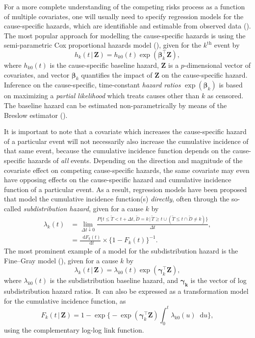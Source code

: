 \documentclass[
  letterpaper,
  paper=240mm:170mm,
  twoside=true,
  open=right,
  fontsize=10pt,
  pagesize=false,
  BCOR=15mm,
  DIV=14,
  headinclude=true,
  footinclude=false,
  headsepline=on]{scrbook}
\newcommand{\given}{\,|\,}
\newcommand\diff{\mathop{}\!\mathrm{d}}
\begin{document}
For a more complete understanding of the competing risks process as a
function of multiple covariates, one will usually need to specify
regression models for the cause-specific hazards, which are identifiable
and estimable from observed data
(). The most popular approach for modelling the cause-specific
hazards is using the semi-parametric Cox proportional hazards model
(), given for
the \(k^{\text{th}}\) event by \[
h_k(t \given \mathbf{Z}) = h_{k0}(t)\exp(\boldsymbol{\beta}_k^\intercal \mathbf{Z}),
\] where \(h_{k0}(t)\) is the cause-specific baseline hazard,
\(\mathbf{Z}\) is a \(p\)-dimensional vector of covariates, and vector
\(\boldsymbol{\beta}_k\) quantifies the impact of \(\mathbf{Z}\) on the
cause-specific hazard. Inference on the cause-specific, time-constant
\emph{hazard ratios} \(\exp(\boldsymbol{\beta}_k)\) is based on
maximizing a \emph{partial likelihood} which treats causes other than
\(k\) as censored. The baseline hazard can be estimated
non-parametrically by means of the Breslow estimator
().

It is important to note that a covariate which increases the
cause-specific hazard of a particular event will not necessarily also
increase the cumulative incidence of that same event, because the
cumulative incidence function depends on the cause-specific hazards of
\emph{all} events. Depending on the direction and magnitude of the
covariate effect on competing cause-specific hazards, the same covariate
may even have opposing effects on the cause-specific hazard and
cumulative incidence function of a particular event. As a result,
regression models have been proposed that model the cumulative incidence
function(s) \emph{directly}, often through the so-called
\emph{subdistribution hazard}, given for a cause \(k\) by \[
\begin{aligned}
    \lambda_k(t) &= \lim_{\Delta t \downarrow 0} \frac{P\{t \leq \tilde{T} < t + \Delta t, \tilde{D} = k \given \tilde{T} \geq t \cup (\tilde{T} \leq t \cap \tilde{D} \neq k)\}}{\Delta t}, \\
    &= \frac{\diff F_k(t)}{\diff t} \times \{1 - F_k(t)\}^{-1}.
\end{aligned}
\] The most prominent example of a model for the subdistribution hazard
is the Fine--Gray model
(),
given for a cause \(k\) by \[
\lambda_k(t \given \mathbf{Z}) = \lambda_{k0}(t)\exp(\boldsymbol{\gamma}_k^\intercal \mathbf{Z}),
\] where \(\lambda_{k0}(t)\) is the subdistribution baseline hazard, and
\(\boldsymbol{\gamma_k}\) is the vector of log subdistribution hazard
ratios. It can also be expressed as a transformation model for the
cumulative incidence function, as \[
F_k(t \given \mathbf{Z}) = 1 - \exp \Biggl\{ -\exp(\boldsymbol{\gamma}_k^\intercal \mathbf{Z}) \int_{0}^{t} \lambda_{k0}(u)\diff u \Biggr\},
\] using the complementary log-log link function.
\end{document}
